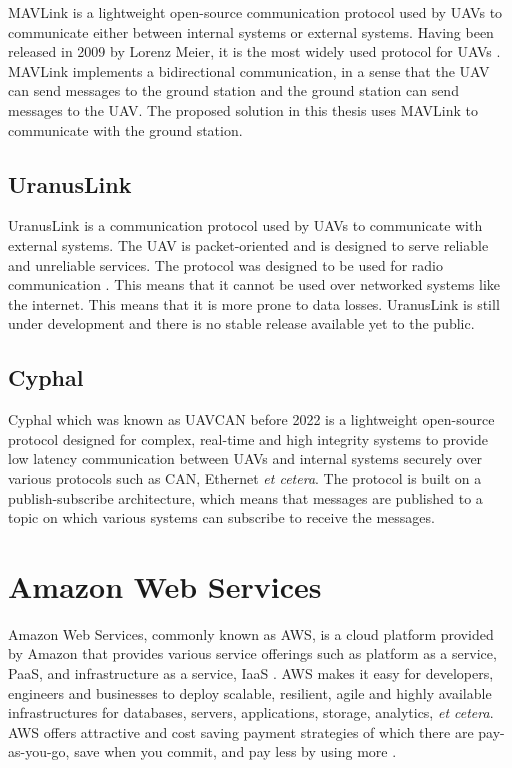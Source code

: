 MAVLink is a lightweight open-source communication protocol used by UAVs to communicate either between internal systems or external systems. Having been released in 2009 by Lorenz Meier, it is the most widely used protocol for UAVs \cite{mavlinkdocumentation}. MAVLink implements a bidirectional communication, in a sense that the UAV can send messages to the ground station and the ground station can send messages to the UAV. The proposed solution in this thesis uses MAVLink to communicate with the ground station.

\subsection{UranusLink}
\label{subsec:uranuslink}

UranusLink is a communication protocol used by UAVs to communicate with external systems. The UAV is packet-oriented and is designed to serve reliable and unreliable services. The protocol was designed to be used for radio communication \cite{Kriz2015}. This means that it cannot be used over networked systems like the internet. This means that it is more prone to data losses. UranusLink is still under development and there is no stable release available yet to the public.

\subsection{Cyphal}
\label{subsec:cyphal}

Cyphal which was known as UAVCAN before 2022 is a lightweight open-source protocol designed for complex, real-time and high integrity systems to provide low latency communication between UAVs and internal systems securely over various protocols such as CAN, Ethernet \textit{et cetera}. The protocol is built on a publish-subscribe architecture, which means that messages are published to a topic on which various systems can subscribe to receive the messages. \cite{cyphaldocumentation}



\section{Amazon Web Services}
\label{sec:aws}

Amazon Web Services, commonly known as AWS, is a cloud platform provided by Amazon that provides various service offerings such as platform as a service, PaaS, and infrastructure as a service, IaaS \cite{awswhatisaws2022}. AWS makes it easy for developers, engineers and businesses to deploy scalable, resilient, agile and highly available infrastructures for databases, servers, applications, storage, analytics, \textit{et cetera}. AWS offers attractive and cost saving payment strategies of which there are pay-as-you-go, save when you commit, and pay less by using more \cite{awspricing2022}.

